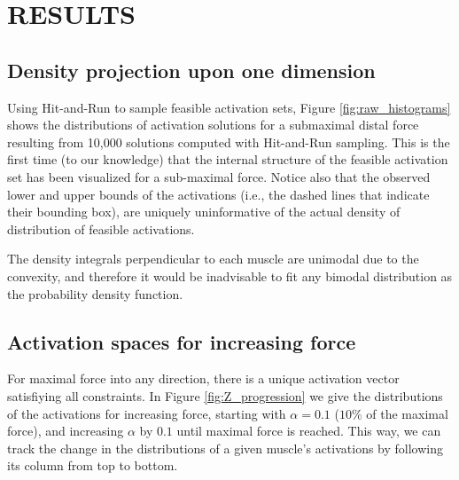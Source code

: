 

\section{RESULTS}
\subsection{Density projection upon one dimension} %
\label{ssub:density_projection_upon_one_dimension}


Using Hit-and-Run to sample feasible activation sets, Figure \ref{fig:raw_histograms} shows the distributions of activation solutions for a submaximal distal force resulting from 10,000 solutions computed with Hit-and-Run sampling.
This is the first time (to our knowledge) that the internal structure of the feasible activation set has been visualized for a sub-maximal force.
Notice also that the observed lower and upper bounds of the activations (i.e., the dashed lines that indicate their bounding box), are uniquely uninformative of the actual density of distribution of feasible activations.

The density integrals perpendicular to each muscle are unimodal due to the convexity\cite{ball1997elementary}, and therefore it would be inadvisable to fit any bimodal distribution as the probability density function.

\subsection{Activation spaces for increasing force} %
\label{sub:activation_spaces_for_increasing_force}
For maximal force into any direction, there is a unique activation vector satisfiying all constraints.
In Figure \ref{fig:Z_progression} we give the distributions of the activations for increasing force, starting with $\alpha=0.1$ ($10\%$ of the maximal force), and increasing $\alpha$ by $0.1$ until maximal force is reached.
This way, we can track the change in the distributions of a given muscle's activations by following its column from top to bottom.

